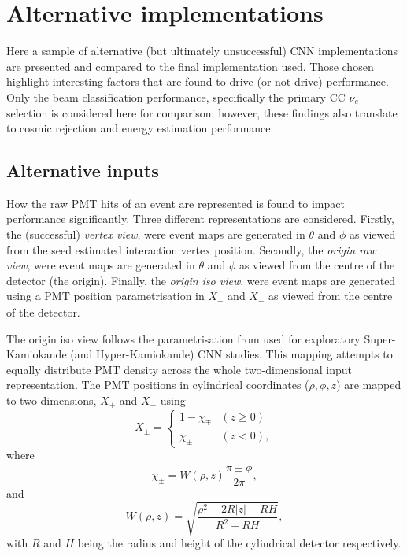 \section{Alternative implementations} %
\label{sec:results_alt} %

Here a sample of alternative (but ultimately unsuccessful) \chips CNN implementations are
presented and compared to the final implementation used. Those chosen highlight interesting
factors that are found to drive (or not drive) performance. Only the beam classification
performance, specifically the primary CC $\nu_{e}$ selection is considered here for comparison;
however, these findings also translate to cosmic rejection and energy estimation performance.

\subsection{Alternative inputs} %
\label{sec:results_alt_inputs} %

How the raw PMT hits of an event are represented is found to impact performance significantly.
Three different representations are considered. Firstly, the (successful) \emph{vertex view}, were
event maps are generated in $\theta$ and $\phi$ as viewed from the seed estimated interaction
vertex position. Secondly, the \emph{origin raw view}, were event maps are generated in $\theta$
and $\phi$ as viewed from the centre of the detector (the origin). Finally, the \emph{origin iso
view}, were event maps are generated using a PMT position parametrisation in $X_{+}$ and $X_{-}$
as viewed from the centre of the detector.

The origin iso view follows the parametrisation from  used for exploratory
Super-Kamiokande (and Hyper-Kamiokande) CNN studies. This mapping attempts to equally distribute
PMT density across the whole two-dimensional input representation. The PMT positions in
cylindrical coordinates ($\rho,\phi,z$) are mapped to two dimensions, $X_{+}$ and $X_{-}$ using
\begin{equation} %
    X_{\pm}=
    \begin{cases}
        1-\chi_{\mp} & (z \geq 0) \\
        \chi_{\pm}   & (z < 0),
    \end{cases}
    \label{eq:iso_case}
\end{equation}
where
\begin{equation} %
    \chi_{\pm}=W(\rho,z)\frac{\pi\pm\phi}{2\pi},
    \label{eq:iso_main}
\end{equation}
and
\begin{equation} %
    W(\rho,z)=\sqrt{\frac{\rho^{2}-2R|z|+RH}{R^{2}+RH}},
    \label{eq:iso_part}
\end{equation}
with $R$ and $H$ being the radius and height of the cylindrical detector respectively.

